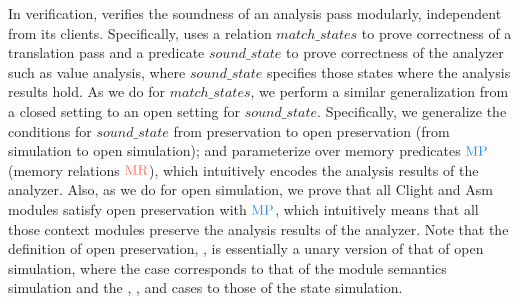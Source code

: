 In verification, \cc{} verifies the soundness of an analysis pass modularly, independent from its clients.
Specifically,
\cc{} uses a relation $match\_states$ to prove correctness of a translation pass
and a predicate $sound\_state$ to prove correctness of the analyzer such as value analysis,
where $sound\_state$ specifies those states where the analysis results hold.
As we do for $match\_states$,
we perform a similar generalization from a closed setting to an open setting for $sound\_state$.
Specifically, 
we generalize the conditions for $sound\_state$ from preservation to open preservation
(\cf from simulation to open simulation);
and parameterize over memory predicates $\MPRED{}$ (\cf memory relations $\MREL{}$),
which intuitively encodes the analysis results of the analyzer.
Also, as we do for open simulation,
we prove that all \textrm{Clight} and \textrm{Asm} modules satisfy
open preservation with $\MPRED{}$, which intuitively means that
all those context modules preserve the analysis results of the analyzer.
Note that the definition of open preservation, , is essentially a unary version of
that of open simulation, where the  case corresponds
to that of the module semantics simulation and the ,
, and  cases to those of the state simulation.





